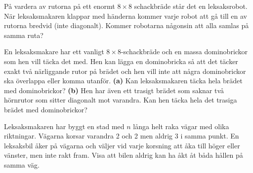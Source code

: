 \setcounter{theorem}{0}
\setcounter{section}{\thesection+1} %
% 
% 
% 
\begin{problem}
 	På vardera av rutorna på ett enormt \(8 \times 8\) schackbräde står det en leksaksrobot. När leksaksmakaren klappar med händerna kommer varje robot att gå till en av rutorna bredvid (inte diagonalt). Kommer robotarna någonsin att alla samlas på samma ruta?
\end{problem}

\begin{problem}
	En leksaksmakare har ett vanligt \(8 \times 8\)-schackbräde och en massa dominobrickor som hen vill täcka det med. Hen kan lägga en dominobricka så att det täcker exakt två närliggande rutor på brädet och hen vill inte att några dominobrickor ska överlappa eller komma utanför. \textbf{(a)} Kan leksaksmakaren täcka hela brädet med dominobrickor? \textbf{(b)} Hen har även ett trasigt brädet som saknar två hörnrutor som sitter diagonalt mot varandra. Kan hen täcka hela det trasiga brädet med dominobrickor?
\end{problem}


\begin{problem}
	Leksaksmakaren har byggt en stad med \(n\) långa helt raka vägar med olika riktningar. Vägarna korsar varandra 2 och 2 men aldrig 3 i samma punkt. En leksaksbil åker på vägarna och väljer vid varje korsning att åka till höger eller vänster, men inte rakt fram. Visa att bilen aldrig kan ha åkt åt båda hållen på samma väg.
\end{problem}

